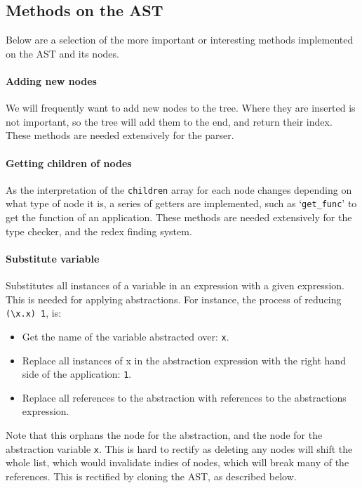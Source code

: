 \subsection{Methods on the AST}
Below are a selection of the more important or interesting methods implemented on the AST and its nodes.

\paragraph{Adding new nodes} We will frequently want to add new nodes to the tree. Where they are inserted is not important, so the tree will add them to the end, and return their index. These methods are needed extensively for the parser.

\paragraph{Getting children of nodes} As the interpretation of the \verb|children| array for each node changes depending on what type of node it is, a series of getters are implemented, such as `\verb|get_func|' to get the function of an application. These methods are needed extensively for the type checker, and the redex finding system. 

\paragraph{Substitute variable} Substitutes all instances of a variable in an expression with a given expression. This is needed for applying abstractions. For instance, the process of reducing \verb|(\x.x) 1|, is:
\begin{itemize}
    \item Get the name of the variable abstracted over: \verb|x|.
    \item Replace all instances of x in the abstraction expression with the right hand side of the application: \verb|1|.
    \item Replace all references to the abstraction with references to the abstractions expression. 
\end{itemize}

Note that this orphans the node for the abstraction, and the node for the abstraction variable \verb|x|. This is hard to rectify as deleting any nodes will shift the whole list, which would invalidate indies of nodes, which will break many of the references. This is rectified by cloning the AST, as described below.

